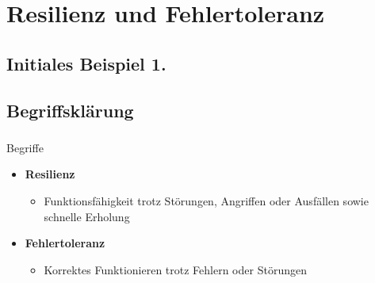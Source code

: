%

\section{Resilienz und Fehlertoleranz}

\subsection{Initiales Beispiel 1.}

\begin{frame}
    \frametitle{\insertsection}
    \framesubtitle{\insertsubsection}

\end{frame}

\subsection{Begriffsklärung}

\begin{frame}
    \frametitle{\insertsection}
    \framesubtitle{\insertsubsection}

    \begin{block}{Begriffe}
        \begin{itemize}
            \item \textbf{Resilienz}
                \begin{itemize}
                     \item Funktionsfähigkeit trotz Störungen, Angriffen oder Ausfällen sowie schnelle Erholung
                \end{itemize}
            \item \textbf{Fehlertoleranz}
                \begin{itemize}
                    \item Korrektes Funktionieren trotz Fehlern oder Störungen
                \end{itemize}
        \end{itemize}
    \end{block}
\end{frame}


